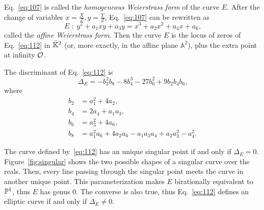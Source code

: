 Eq.~\eqref{eq:107} is called the \emph{homogeneous Weierstrass
  form} of the curve $E$.  After
the change of variables $x=\frac{X}{Z},y=\frac{Y}{Z}$,
Eq.~\eqref{eq:107} can be rewritten as
\begin{equation}
  \label{eq:112}
  E\;:\;y^2 + a_1xy + a_3y = x^3 + a_2x^2 + a_4x + a_6
  \text{,}
\end{equation}
called the \emph{affine Weierstrass
  form}. Then the curve $E$ is the
locus of zeros of Eq.~\eqref{eq:112} in $\bar{\mathbb{K}}^2$ (or, more
exactly, in the affine plane $\mathbb{A}^2$), plus the extra point at
infinity $\mathcal{O}$.

The discriminant
 of
Eq.~\eqref{eq:112} is
\begin{equation}
  \label{eq:118}
  \Delta_E = -b_2^2b_8-8b_4^3-27b_6^2+9b_2b_4b_6
  \text{,}
\end{equation}
where
\begin{equation}
  \label{eq:117}
  \begin{aligned}
    b_2 &= a_1^2 + 4a_2\text{,}\\
    b_4 &= 2a_4 + a_1a_3\text{,}\\
    b_6 &= a_3^2 + 4a_6\text{,}\\
    b_8 &= a_1^2a_6+4a_2a_6-a_1a_3a_4+a_2a_3^2-a_4^2\text{.}
  \end{aligned}
\end{equation}

\begin{remark}
  The curve defined by~\eqref{eq:112} has an unique singular point if
  and only if $\Delta_E=0$.  Figure~\ref{fig:singular} shows the two
  possible shapes of a singular curve over the reals. Then, every line
  passing through the singular point meets the curve in another unique
  point. This parameterization makes $E$ birationally equivalent to
  $\mathbb{P}^1$, thus $E$ has genus $0$. The converse is also true, thus
  Eq.~\eqref{eq:112} defines an elliptic curve if and only if
  $\Delta_E\ne0$.
\end{remark}


